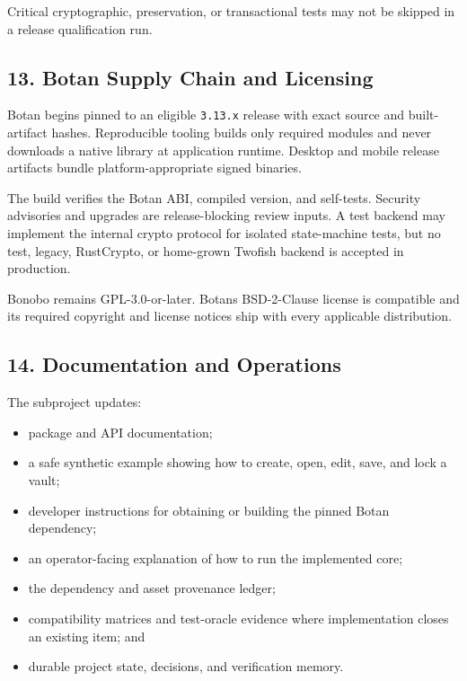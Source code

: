 \documentclass[
  letterpaper,
]{article}
\newcommand{\passthrough}[1]{#1}
\providecommand{\tightlist}{%
  \setlength{\itemsep}{0pt}\setlength{\parskip}{0pt}}
\begin{document}
Critical cryptographic, preservation, or transactional tests may not be skipped in a release qualification run.

\subsection{13. Botan Supply Chain and Licensing}\label{13-botan-supply-chain-and-licensing}

Botan begins pinned to an eligible \passthrough{\lstinline!3.13.x!} release with exact source and built-artifact hashes.
Reproducible tooling builds only required modules and never downloads a native library at application runtime. Desktop
and mobile release artifacts bundle platform-appropriate signed binaries.

The build verifies the Botan ABI, compiled version, and self-tests. Security advisories and upgrades are
release-blocking review inputs. A test backend may implement the internal crypto protocol for isolated state-machine
tests, but no test, legacy, RustCrypto, or home-grown Twofish backend is accepted in production.

Bonobo remains GPL-3.0-or-later. Botan\textquotesingle s BSD-2-Clause license is compatible and its required copyright
and license notices ship with every applicable distribution.

\subsection{14. Documentation and Operations}\label{14-documentation-and-operations}

The subproject updates:

\begin{itemize}
\tightlist
\item
  package and API documentation;
\item
  a safe synthetic example showing how to create, open, edit, save, and lock a vault;
\item
  developer instructions for obtaining or building the pinned Botan dependency;
\item
  an operator-facing explanation of how to run the implemented core;
\item
  the dependency and asset provenance ledger;
\item
  compatibility matrices and test-oracle evidence where implementation closes an existing item; and
\item
  durable project state, decisions, and verification memory.
\end{itemize}
\end{document}
